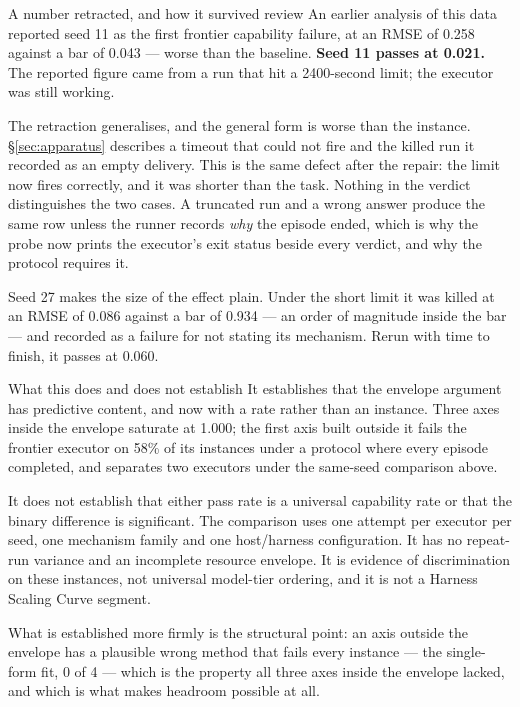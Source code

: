 \documentclass[11pt]{article}
\theoremstyle{definition}
\begin{document}
\begin{cautionbox}{A number retracted, and how it survived review}
An earlier analysis of this data reported seed 11 as the first frontier capability failure, at an RMSE of 0.258 against a bar of 0.043 --- worse than the baseline. \textbf{Seed 11 passes at 0.021.} The reported figure came from a run that hit a 2400-second limit; the executor was still working.

The retraction generalises, and the general form is worse than the instance. \S\ref{sec:apparatus} describes a timeout that could not fire and the killed run it recorded as an empty delivery. This is the same defect after the repair: the limit now fires correctly, and it was shorter than the task. Nothing in the verdict distinguishes the two cases. A truncated run and a wrong answer produce the same row unless the runner records \emph{why} the episode ended, which is why the probe now prints the executor's exit status beside every verdict, and why the protocol requires it.

Seed 27 makes the size of the effect plain. Under the short limit it was killed at an RMSE of 0.086 against a bar of 0.934 --- an order of magnitude inside the bar --- and recorded as a failure for not stating its mechanism. Rerun with time to finish, it passes at 0.060.
\end{cautionbox}

\begin{claimbox}{What this does and does not establish}
It establishes that the envelope argument has predictive content, and now with a rate rather than an instance. Three axes inside the envelope saturate at 1.000; the first axis built outside it fails the frontier executor on 58\% of its instances under a protocol where every episode completed, and separates two executors under the same-seed comparison above.

It does not establish that either pass rate is a universal capability rate or that the binary difference is significant. The comparison uses one attempt per executor per seed, one mechanism family and one host/harness configuration. It has no repeat-run variance and an incomplete resource envelope. It is evidence of discrimination on these instances, not universal model-tier ordering, and it is not a Harness Scaling Curve segment.
\end{claimbox}

What is established more firmly is the structural point: an axis outside the envelope has a plausible wrong method that fails every instance --- the single-form fit, 0 of 4 --- which is the property all three axes inside the envelope lacked, and which is what makes headroom possible at all.
\end{document}
